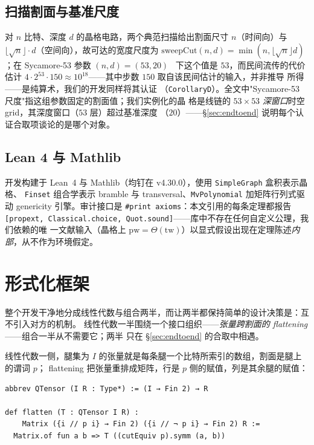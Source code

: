 \documentclass[11pt]{ctexart}
\newcommand{\pw}{\mathrm{pw}}
\newcommand{\tw}{\mathrm{tw}}
\begin{document}
\subsection{扫描割面与基准尺度}
对 $n$ 比特、深度 $d$ 的晶格电路，两个典范扫描给出割面尺寸 $n$（时间向）与
$\lfloor\sqrt{n}\rfloor\cdot d$（空间向），故可达的宽度尺度为
$\mathrm{sweepCut}(n,d)=\min(n,\lfloor\sqrt{n}\rfloor d)$；在 Sycamore-53 参数
$(n,d)=(53,20)$~\cite{arute2019quantum} 下这个值是 $53$，而民间流传的代价估计
$4\cdot 2^{53}\cdot 150\approx 10^{18}$——其中步数 $150$ 取自该民间估计的输入，并非推导
所得——是纯算术，我们的开发同样将其认证
（\texttt{CorollaryD}）。全文中"Sycamore-53 尺度"指这组参数固定的割面值；我们实例化的晶
格是线链的 $53\times53$ \emph{深窗口}时空 grid，其深度窗口（$53$ 层）超过基准深度
（$20$）——\S\ref{sec:endtoend} 说明每个认证合取项谈论的是哪个对象。

\subsection{Lean 4 与 Mathlib}
开发构建于 Lean~4 与 Mathlib（均钉在 v4.30.0），使用 \texttt{SimpleGraph} 盒积表示晶格、
\texttt{Finset} 组合学表示 bramble 与 transversal、\texttt{MvPolynomial} 加矩阵行列式驱动
genericity 引擎。审计接口是 \texttt{\#print axioms}：本文引用的每条定理都报告
\texttt{[propext, Classical.choice, Quot.sound]}——库中不存在任何自定义公理，我们依赖的唯
一文献输入（晶格上 $\pw=\Theta(\tw)$）以显式假设出现在定理陈述\emph{内部}，从不作为环境假定。

\section{形式化框架}\label{sec:framework}

整个开发干净地分成线性代数与组合两半，而让两半都保持简单的设计决策是：互不引入对方的机制。
线性代数一半围绕一个接口组织——\emph{张量跨割面的 flattening}——组合一半从不需要它；两半
只在 \S\ref{sec:endtoend} 的合取中相遇。

线性代数一侧，腿集为 $I$ 的张量就是每条腿一个比特所索引的数组，割面是腿上的谓词 $p$；
flattening 把张量重排成矩阵，行是 $p$ 侧的赋值，列是其余腿的赋值：

\begin{lstlisting}
abbrev QTensor (I R : Type*) := (I → Fin 2) → R

def flatten (T : QTensor I R) :
    Matrix ({i // p i} → Fin 2) ({i // ¬ p i} → Fin 2) R :=
  Matrix.of fun a b => T ((cutEquiv p).symm (a, b))
\end{lstlisting}
\end{document}
